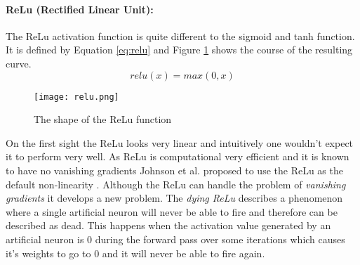 \paragraph{ReLu (Rectified Linear Unit):}
The ReLu activation function is quite different to the sigmoid and tanh function. It is defined by Equation \ref{eq:relu} and Figure \ref{fig:relu} shows the course of the resulting curve.
\begin{equation}\label{eq:relu}
relu(x) = max(0, x)
\end{equation}
\begin{figure}
\centering
  \texttt{[image: relu.png]}
  \caption{The shape of the ReLu function \cite{Chris2017}}
  \label{fig:relu}
\end{figure}
On the first sight the ReLu looks very linear and intuitively one wouldn't expect it to perform very well.
As ReLu is computational very efficient and it is known to have no vanishing gradients Johnson et al. proposed to use the ReLu as the default non-linearity \cite{ConvNNs}.
Although the ReLu can handle the problem of \emph{vanishing gradients} it develops a new problem.
The \emph{dying ReLu} describes a phenomenon where a single artificial neuron will never be able to fire and therefore can be described as dead.
This happens when the activation value generated by an artificial neuron is $0$ during the forward pass over some iterations which causes it's weights to go to $0$ and it will never be able to fire again.

